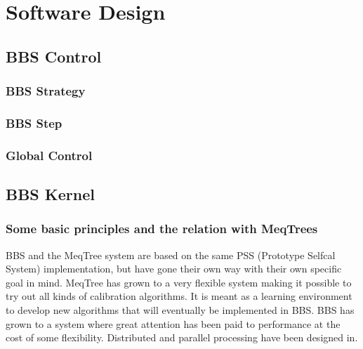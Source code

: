 \documentclass[10pt]{lofar}
\begin{document}
\pagebreak

\section{Software Design}
\label{sec:software-design}

\subsection{BBS Control}
\label{subsec:design-control}

\subsubsection{BBS Strategy}
\label{subsubsec:design-strategy}

\subsubsection{BBS Step}
\label{subsubsec:design-step}

\subsubsection{Global Control}
\label{subsubsec:design-global-control}

\subsection{BBS Kernel}
\label{subsec:design-kernel}

\subsubsection{Some basic principles and the relation with MeqTrees}
\label{subsubsec:design-principles}
BBS and the MeqTree system  are based on the same PSS (Prototype Selfcal System) implementation, but have gone their own way with their own specific goal in mind. MeqTree has grown to a very flexible system making it possible to try out all kinds of calibration algorithms. It is meant as a learning environment to develop new algorithms that will eventually be implemented in BBS. BBS has grown to a system where great attention has been paid to performance at the cost of some flexibility. Distributed and parallel processing have been designed in.
\end{document}
